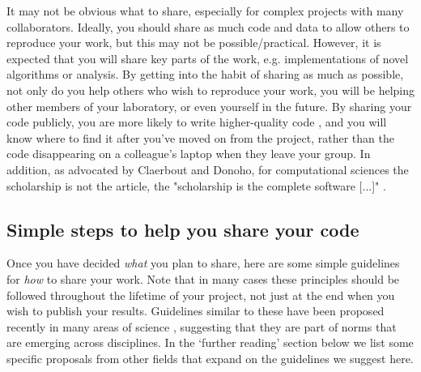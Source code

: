 \documentclass[11pt]{article}
\begin{document}
It may not be obvious what to share, especially for complex projects with many collaborators.  Ideally,
you should share as much code and data to allow others to reproduce
your work,  but this may not be possible/practical.  However, it
is expected that you will share key parts of the work, e.g. implementations of novel algorithms or analysis.  By getting into the habit of sharing as much as possible, not only do you help others who wish to reproduce your work, you will be helping other members of your laboratory, or even yourself in the future.  By sharing your code publicly, you are more likely to write higher-quality code \cite{Easterbrook2014}, and you will know where to find it after you've moved on from the project, rather than the code disappearing on a colleague's laptop when they leave your group. In addition, as advocated by Claerbout and Donoho, for computational sciences the scholarship is not the article, the "scholarship is the complete software [...]" \cite{claerbout_electronic_1992,donoho_invitation_2010}.

\subsection*{Simple steps to help you share your code}

Once you have decided \textit{what} you plan to share, here are some simple 
guidelines for \textit{how} to share your work.  Note that in many cases these
principles should be followed throughout the lifetime of your project,
not just at the end when you wish to publish your results. Guidelines similar to these have been proposed recently in many areas of science \cite{Nosek2015, miguel2014, stodden2012journals}, suggesting that they are part of norms that are emerging across disciplines. In the `further reading' section below we list some specific proposals from other fields that expand on the guidelines we suggest here.  
\end{document}
